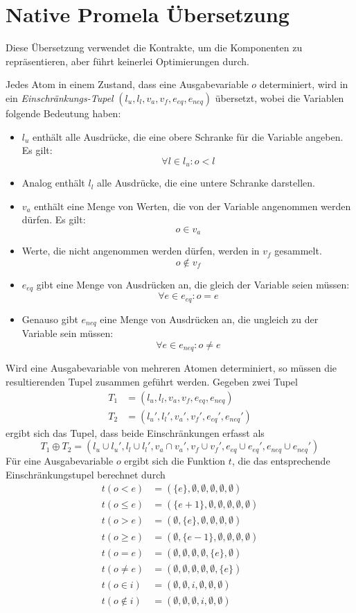 \section{Native Promela Übersetzung}
Diese Übersetzung verwendet die Kontrakte, um die Komponenten zu repräsentieren, aber führt keinerlei Optimierungen durch.

Jedes Atom in einem Zustand, dass eine Ausgabevariable $o$ determiniert, wird in ein \emph{Einschränkungs-Tupel} $(l_u,l_l,v_a,v_f,e_{eq},e_{neq})$ übersetzt, wobei die Variablen folgende Bedeutung haben:
\begin{itemize}
\item $l_u$ enthält alle Ausdrücke, die eine obere Schranke für die Variable angeben.
  Es gilt:
  \[ \forall l\in l_u: o < l \]
\item Analog enthält $l_l$ alle Ausdrücke, die eine untere Schranke darstellen.
\item $v_a$ enthält eine Menge von Werten, die von der Variable angenommen werden dürfen.
  Es gilt:
  \[ o\in v_a \]
\item Werte, die nicht angenommen werden dürfen, werden in $v_f$ gesammelt.
  \[ o\not\in v_f \]
\item $e_{eq}$ gibt eine Menge von Ausdrücken an, die gleich der Variable seien müssen:
  \[ \forall e\in e_{eq}: o=e \]
\item Genauso gibt $e_{neq}$ eine Menge von Ausdrücken an, die ungleich zu der Variable sein müssen:
  \[ \forall e\in e_{neq}: o\neq e \]
\end{itemize}
Wird eine Ausgabevariable von mehreren Atomen determiniert, so müssen die resultierenden Tupel zusammen geführt werden.
Gegeben zwei Tupel
\begin{align*}
  T_1 &= (l_u,l_l,v_a,v_f,e_{eq},e_{neq})\\
  T_2 &= (l_u',l_l',v_a',v_f',e_{eq}',e_{neq}')
\end{align*}
ergibt sich das Tupel, dass beide Einschränkungen erfasst als
\[ T_1\oplus T_2 = (l_u\cup l_u',l_l\cup l_l',v_a\cap v_a',v_f\cup v_f',e_{eq}\cup e_{eq}',e_{neq}\cup e_{neq}') \]
Für eine Ausgabevariable $o$ ergibt sich die Funktion $t$, die das entsprechende Einschränkungstupel berechnet durch
\begin{align*}
  t(o < e) &= (\{e\},\emptyset,\emptyset,\emptyset,\emptyset,\emptyset)\\
  t(o\leq e) &= (\{e+1\},\emptyset,\emptyset,\emptyset,\emptyset,\emptyset)\\
  t(o > e) &= (\emptyset,\{e\},\emptyset,\emptyset,\emptyset,\emptyset)\\
  t(o \geq e) &= (\emptyset,\{e-1\},\emptyset,\emptyset,\emptyset,\emptyset)\\
  t(o = e) &= (\emptyset,\emptyset,\emptyset,\emptyset,\{e\},\emptyset)\\
  t(o\neq e) &= (\emptyset,\emptyset,\emptyset,\emptyset,\emptyset,\{e\})\\
  t(o\in i) &= (\emptyset,\emptyset,i,\emptyset,\emptyset,\emptyset)\\
  t(o\not\in i) &= (\emptyset,\emptyset,\emptyset,i,\emptyset,\emptyset)\\
\end{align*}
